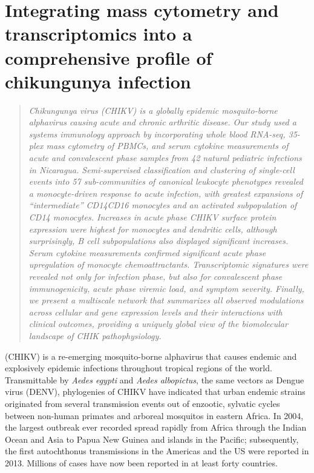 
\chapter{Integrating mass cytometry and transcriptomics into a comprehensive profile of chikungunya infection}
\label{chap:chik}

\newcommand{\subcommunity}{sub-\allowbreak com\-mu\-ni\-ty}
\newcommand{\subcommunities}{sub-\allowbreak com\-mu\-ni\-ties}
\newcommand{\Subcommunities}{Sub-\allowbreak com\-mu\-ni\-ties}
\newcommand{\pertranscript}{per-\allowbreak trans\-cript}

\begin{quote}
\emph{Chikungunya virus (CHIKV) is a globally epidemic mosquito-borne alphavirus causing acute and chronic arthritic disease. Our study used a systems immunology approach by incorporating whole blood RNA-seq, 35-plex mass cytometry of PBMCs, and serum cytokine measurements of acute and convalescent phase samples from 42 natural pediatric infections in Nicaragua. Semi-supervised classification and clustering of single-cell events into 57 \subcommunities{} of canonical leukocyte phenotypes revealed a monocyte-driven response to acute infection, with greatest expansions of “intermediate” CD14\sups{++}\allowbreak CD16\sups{+} monocytes and an activated subpopulation of CD14\sups{+} monocytes. Increases in acute phase CHIKV surface protein expression were highest for monocytes and dendritic cells, although surprisingly, B cell subpopulations also displayed significant increases. Serum cytokine measurements confirmed significant acute phase upregulation of monocyte chemoattractants. Transcriptomic signatures were revealed not only for infection phase, but also for convalescent phase immunogenicity, acute phase viremic load, and symptom severity. Finally, we present a multiscale network that summarizes all observed modulations across cellular and gene expression levels and their interactions with clinical outcomes, providing a uniquely global view of the biomolecular landscape of CHIK pathophysiology.}
\end{quote}

 (CHIKV) is a re-emerging mosquito-borne alphavirus that causes endemic and explosively epidemic infections throughout tropical regions of the world.\autocite{Weaver2015} Transmittable by \emph{Aedes egypti} and \emph{Aedes albopictus}, the same vectors as Dengue virus (DENV), phylogenies of CHIKV have indicated that urban endemic strains originated from several transmission events out of enzootic, sylvatic cycles between non-human primates and arboreal mosquitos in eastern Africa.\autocite{Volk2010} In 2004, the largest outbreak ever recorded spread rapidly from Africa through the Indian Ocean and Asia to Papua New Guinea and islands in the Pacific; subsequently, the first autochthonus transmissions in the Americas and the US were reported in 2013.\autocite{Nasci2014} Millions of cases have now been reported in at least forty countries.\autocite{Suhrbier2012}

